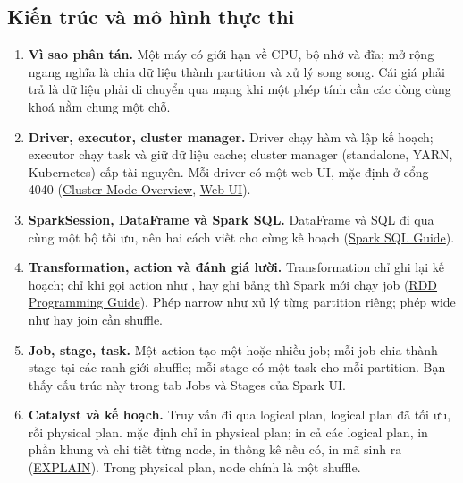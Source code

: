 \subsection{Kiến trúc và mô hình thực thi}
\begin{enumerate}
  \item \textbf{Vì sao phân tán.} Một máy có giới hạn về CPU, bộ nhớ và đĩa; mở rộng ngang nghĩa là chia dữ liệu thành partition và xử lý song song. Cái giá phải trả là dữ liệu phải di chuyển qua mạng khi một phép tính cần các dòng cùng khoá nằm chung một chỗ.
  \item \textbf{Driver, executor, cluster manager.} Driver chạy hàm  và lập kế hoạch; executor chạy task và giữ dữ liệu cache; cluster manager (standalone, YARN, Kubernetes) cấp tài nguyên. Mỗi driver có một web UI, mặc định ở cổng 4040 (\href{https://spark.apache.org/docs/latest/cluster-overview.html}{Cluster Mode Overview}, \href{https://spark.apache.org/docs/latest/web-ui.html}{Web UI}).
  \item \textbf{SparkSession, DataFrame và Spark SQL.} DataFrame và SQL đi qua cùng một bộ tối ưu, nên hai cách viết cho cùng kế hoạch (\href{https://spark.apache.org/docs/latest/sql-programming-guide.html}{Spark SQL Guide}).
  \item \textbf{Transformation, action và đánh giá lười.} Transformation chỉ ghi lại kế hoạch; chỉ khi gọi action như ,  hay ghi bảng thì Spark mới chạy job (\href{https://spark.apache.org/docs/latest/rdd-programming-guide.html}{RDD Programming Guide}). Phép narrow như  xử lý từng partition riêng; phép wide như  hay join cần shuffle.
  \item \textbf{Job, stage, task.} Một action tạo một hoặc nhiều job; mỗi job chia thành stage tại các ranh giới shuffle; mỗi stage có một task cho mỗi partition. Bạn thấy cấu trúc này trong tab Jobs và Stages của Spark UI.
  \item \textbf{Catalyst và kế hoạch.} Truy vấn đi qua logical plan, logical plan đã tối ưu, rồi physical plan.  mặc định chỉ in physical plan;  in cả các logical plan,  in phần khung và chi tiết từng node,  in thống kê nếu có,  in mã sinh ra (\href{https://spark.apache.org/docs/latest/sql-ref-syntax-qry-explain.html}{EXPLAIN}). Trong physical plan, node  chính là một shuffle.
\end{enumerate}

